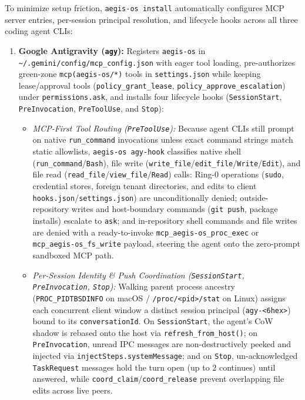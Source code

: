 \documentclass[acmsmall,screen,review]{acmart}
\begin{document}
To minimize setup friction, \texttt{aegis-os install} automatically configures MCP server entries, per-session principal resolution, and lifecycle hooks across all three coding agent CLIs:
\begin{enumerate}
    \item \textbf{Google Antigravity (\texttt{agy}):} Registers \texttt{aegis-os} in \texttt{\textasciitilde/.gemini/config/mcp\_config.json} with eager tool loading, pre-authorizes green-zone \texttt{mcp(aegis-os/*)} tools in \texttt{settings.json} while keeping lease/approval tools (\texttt{policy\_grant\_lease}, \texttt{policy\_approve\_escalation}) under \texttt{permissions.ask}, and installs four lifecycle hooks (\texttt{SessionStart}, \texttt{PreInvocation}, \texttt{PreToolUse}, and \texttt{Stop}):
    \begin{itemize}
        \item \emph{MCP-First Tool Routing (\texttt{PreToolUse}):} Because agent CLIs still prompt on native \texttt{run\_command} invocations unless exact command strings match static allowlists, \texttt{aegis-os agy-hook} classifies native shell (\texttt{run\_command}/\texttt{Bash}), file write (\texttt{write\_file}/\texttt{edit\_file}/\texttt{Write}/\texttt{Edit}), and file read (\texttt{read\_file}/\texttt{view\_file}/\texttt{Read}) calls: Ring-0 operations (\texttt{sudo}, credential stores, foreign tenant directories, and edits to client \texttt{hooks.json}/\texttt{settings.json}) are unconditionally denied; outside-repository writes and host-boundary commands (\texttt{git push}, package installs) escalate to \texttt{ask}; and in-repository shell commands and file writes are denied with a ready-to-invoke \texttt{mcp\_aegis-os\_proc\_exec} or \texttt{mcp\_aegis-os\_fs\_write} payload, steering the agent onto the zero-prompt sandboxed MCP path.
        \item \emph{Per-Session Identity \& Push Coordination (\texttt{SessionStart}, \texttt{PreInvocation}, \texttt{Stop}):} Walking parent process ancestry (\texttt{PROC\_PIDTBSDINFO} on macOS / \texttt{/proc/<pid>/stat} on Linux) assigns each concurrent client window a distinct session principal (\texttt{agy-<6hex>}) bound to its \texttt{conversationId}. On \texttt{SessionStart}, the agent's CoW shadow is rebased onto the host via \texttt{refresh\_from\_host()}; on \texttt{PreInvocation}, unread IPC messages are non-destructively peeked and injected via \texttt{injectSteps.systemMessage}; and on \texttt{Stop}, un-acknowledged \texttt{TaskRequest} messages hold the turn open (up to 2 continues) until answered, while \texttt{coord\_claim}/\texttt{coord\_release} prevent overlapping file edits across live peers.

\end{itemize}
\end{enumerate}
\end{document}
